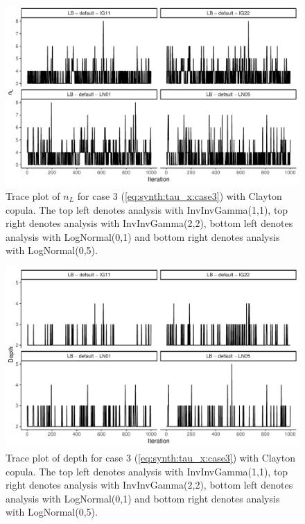 \documentclass{amsart}
\begin{document}
\begin{figure}
	\centering
	\includegraphics[width = 0.75\linewidth]{trace_case3_clayton_nterm.pdf}
	\caption{Trace plot of $n_L$ for case 3 (\cref{eq:synth:tau_x:case3}) with Clayton copula. The top left denotes analysis with InvInvGamma(1,1), top right denotes analysis with InvInvGamma(2,2), bottom left denotes analysis with LogNormal(0,1) and bottom right denotes analysis with LogNormal(0,5).}
	\label{fig:case3:clayton:nterm}
\end{figure}

\begin{figure}
	\centering
	\includegraphics[width = 0.75\linewidth]{trace_case3_clayton_depth.pdf}
	\caption{Trace plot of depth for case 3 (\cref{eq:synth:tau_x:case3}) with Clayton copula. The top left denotes analysis with InvInvGamma(1,1), top right denotes analysis with InvInvGamma(2,2), bottom left denotes analysis with LogNormal(0,1) and bottom right denotes analysis with LogNormal(0,5).}
	\label{fig:case3:clayton:depth}
\end{figure}
\end{document}

